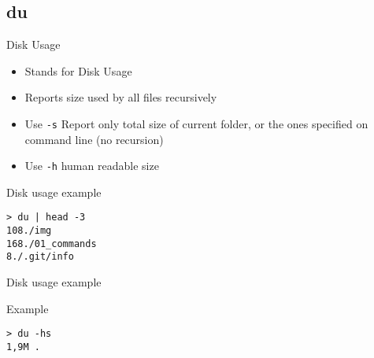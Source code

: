 \subsection{du}

\begin{frame}[fragile]{Disk Usage}
  \begin{itemize}
    \pause \item Stands for Disk Usage
    \pause \item Reports size used by all files recursively
    \pause \item Use \texttt{-s} Report only total size of current folder, or the ones specified on command line (no recursion)
    \pause \item Use \texttt{-h} human readable size
  \end{itemize}
  \pause

  \begin{exampleblock}{Disk usage example}
    \begin{lstlisting}[showstringspaces=false]
> du | head -3
108./img
168./01_commands
8./.git/info
    \end{lstlisting}
  \end{exampleblock}
\end{frame}

\begin{frame}[fragile]{Disk usage example}
  \begin{exampleblock}{Example}
    \begin{lstlisting}[showstringspaces=false]
> du -hs
1,9M .
    \end{lstlisting}
  \end{exampleblock}
\end{frame}

